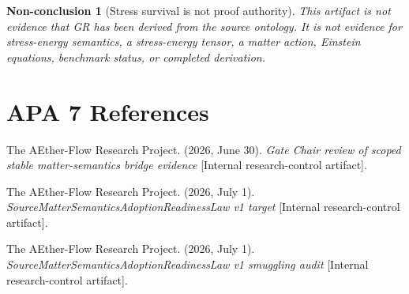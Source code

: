 \documentclass[11pt]{article}
\newtheorem{nonconclusion}{Non-conclusion}
\begin{document}
\begin{nonconclusion}[Stress survival is not proof authority]
This artifact is not evidence that GR has been derived from the source
ontology. It is not evidence for stress-energy semantics, a stress-energy
tensor, a matter action, Einstein equations, benchmark status, or completed
derivation.
\end{nonconclusion}

\section{APA 7 References}

The AEther-Flow Research Project. (2026, June 30).
\emph{Gate Chair review of scoped stable matter-semantics bridge evidence}
[Internal research-control artifact].

The AEther-Flow Research Project. (2026, July 1).
\emph{SourceMatterSemanticsAdoptionReadinessLaw v1 target}
[Internal research-control artifact].

The AEther-Flow Research Project. (2026, July 1).
\emph{SourceMatterSemanticsAdoptionReadinessLaw v1 smuggling audit}
[Internal research-control artifact].
\end{document}
